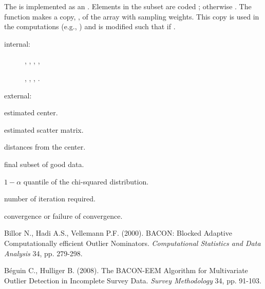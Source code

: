 \documentclass[a4paper,oneside,10pt,DIV=12]{scrreprt}
\begin{document}
\begin{Details}
The  is implemented as an . Elements in the
subset are coded ; otherwise . The function makes a copy,
, of the array  with sampling weights. This copy is used
in the computations (e.g., ) and is modified such that
 if .  
\end{Details}
\begin{Dependencies}
	\begin{description}
		\item[internal:]
		, 
		, 
		, 
		, 

		, 
		, 
		, 
		. 
		\item[external:]
	\end{description}
\end{Dependencies}
\begin{Value}
	\begin{ldescription}
		\item[\code{center}] estimated center.
		\item[\code{scatter}] estimated scatter matrix.
		\item[\code{dist}] distances from the center.
		\item[\code{subset}] final subset of good data.
		\item[\code{cutoff}] $1-\alpha$ quantile of the chi-squared
			distribution.
		\item[\code{maxiter}] number of iteration required.
		\item[\code{success}] convergence or failure of convergence. 
	\end{ldescription}
\end{Value}

\begin{References}
Billor N., Hadi A.S., Vellemann P.F. (2000). BACON: Blocked Adaptive 
Computationally efficient Outlier Nominators. \textit{Computational Statistics
and Data Analysis} 34, pp. 279-298.

B{\'e}guin C., Hulliger B. (2008). The BACON-EEM Algorithm for Multivariate 
Outlier Detection in Incomplete Survey Data. \textit{Survey Methodology} 34, 
pp. 91-103. 
\end{References}
\end{document}
